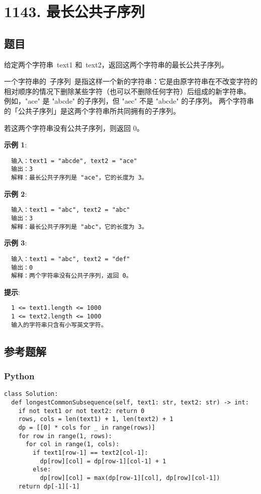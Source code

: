 \newpage
\section{1143. 最长公共子序列}
\label{leetcode:11431}

\subsection{题目}

给定两个字符串 text1 和 text2，返回这两个字符串的最长公共子序列。

一个字符串的 子序列 是指这样一个新的字符串：它是由原字符串在不改变字符的
相对顺序的情况下删除某些字符（也可以不删除任何字符）后组成的新字符串。
例如，"ace" 是 "abcde" 的子序列，但 "aec" 不是 "abcde" 的子序列。
两个字符串的「公共子序列」是这两个字符串所共同拥有的子序列。

若这两个字符串没有公共子序列，则返回 0。

\textbf{示例 1}:

\begin{verbatim}
  输入：text1 = "abcde", text2 = "ace"
  输出：3
  解释：最长公共子序列是 "ace"，它的长度为 3。
\end{verbatim}

\textbf{示例 2}:

\begin{verbatim}
  输入：text1 = "abc", text2 = "abc"
  输出：3
  解释：最长公共子序列是 "abc"，它的长度为 3。
\end{verbatim}

\textbf{示例 3}:

\begin{verbatim}
  输入：text1 = "abc", text2 = "def"
  输出：0
  解释：两个字符串没有公共子序列，返回 0。
\end{verbatim}

\textbf{提示}:

\begin{verbatim}
  1 <= text1.length <= 1000
  1 <= text2.length <= 1000
  输入的字符串只含有小写英文字符。
\end{verbatim}

\subsection{参考题解}

\subsubsection{Python}

\begin{verbatim}
class Solution:
  def longestCommonSubsequence(self, text1: str, text2: str) -> int:
    if not text1 or not text2: return 0
    rows, cols = len(text1) + 1, len(text2) + 1
    dp = [[0] * cols for _ in range(rows)]
    for row in range(1, rows):
      for col in range(1, cols):
        if text1[row-1] == text2[col-1]:
          dp[row][col] = dp[row-1][col-1] + 1
        else:
          dp[row][col] = max(dp[row-1][col], dp[row][col-1])
    return dp[-1][-1]
\end{verbatim}

